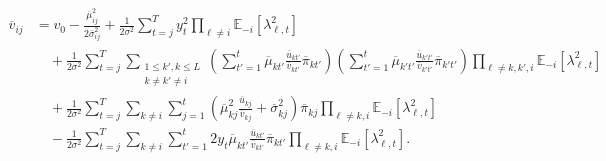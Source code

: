 \documentclass{article}
\newcommand{\E}{\mathbb{E}}
\begin{document}
\begin{align*}
    \overline{v}_{ij} &= v_0 - \frac{\overline{\mu}_{ij}^2}{2\overline{\sigma}_{ij}^2} + \frac{1}{2\sigma^2} \sum_{t=j}^{T} y^2_t\prod_{\ell \neq i} \E_{-i}\left[\lambda_{\ell,t}^2\right] \\
    &\quad + \frac{1}{2\sigma^2} \sum_{t=j}^{T} \sum_{\substack{1 \leq k',k \leq L \\ k \neq k' \neq i}} \left(\sum_{t'=1}^t\overline{\mu}_{k t'}\frac{\overline{u}_{kt'}}{\overline{v}_{kt'}} \overline{\pi}_{kt'} \right)\left(\sum_{t'=1}^t\overline{\mu}_{k' t'}\frac{\overline{u}_{k't'}}{\overline{v}_{k't'}} \overline{\pi}_{k't'} \right)  \prod_{\ell \neq k,k',i} \E_{-i}\left[\lambda_{\ell,t}^2\right] \\
    &\quad + \frac{1}{2\sigma^2} \sum_{t=j}^{T} \sum_{k\neq i} \sum_{j=1}^t \left(\overline{\mu}_{k j}^2 \frac{\overline{u}_{k j}}{\overline{v}_{k j}} + \overline{\sigma}^2_{k j}\right)\overline{\pi}_{kj} \prod_{\ell \neq k,i}  \E_{-i}\left[\lambda_{\ell,t}^2\right] \\
    &\quad - \frac{1}{2\sigma^2} \sum_{t=j}^{T}\sum_{k\neq i}\sum_{t'=1}^t  2 y_t \overline{\mu}_{k t'}\frac{\overline{u}_{kt'}}{\overline{v}_{kt'}} \overline{\pi}_{kt'} \prod_{\ell \neq k,i}  \E_{-i}\left[\lambda_{\ell,t}^2\right].
\end{align*}
\normalsize
\end{document}
